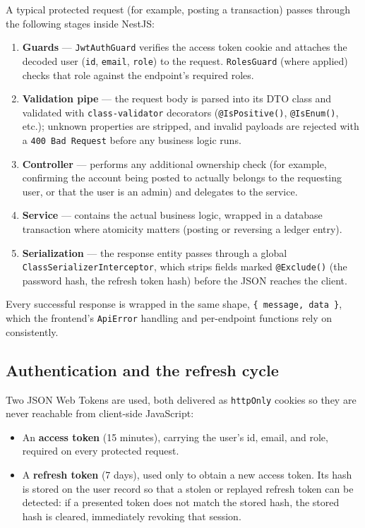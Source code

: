 \documentclass[11pt]{article}
\begin{document}
A typical protected request (for example, posting a transaction) passes
through the following stages inside NestJS:

\begin{enumerate}[nosep]
    \item \textbf{Guards} --- \texttt{JwtAuthGuard} verifies the access
    token cookie and attaches the decoded user (\texttt{id}, \texttt{email},
    \texttt{role}) to the request. \texttt{RolesGuard} (where applied)
    checks that role against the endpoint's required roles.
    \item \textbf{Validation pipe} --- the request body is parsed into
    its DTO class and validated with \texttt{class-validator} decorators
    (\texttt{@IsPositive()}, \texttt{@IsEnum()}, etc.); unknown properties
    are stripped, and invalid payloads are rejected with a
    \texttt{400 Bad Request} before any business logic runs.
    \item \textbf{Controller} --- performs any additional ownership check
    (for example, confirming the account being posted to actually belongs
    to the requesting user, or that the user is an admin) and delegates
    to the service.
    \item \textbf{Service} --- contains the actual business logic,
    wrapped in a database transaction where atomicity matters (posting or
    reversing a ledger entry).
    \item \textbf{Serialization} --- the response entity passes through a
    global \texttt{ClassSerializerInterceptor}, which strips fields
    marked \texttt{@Exclude()} (the password hash, the refresh token
    hash) before the JSON reaches the client.
\end{enumerate}

Every successful response is wrapped in the same shape,
\texttt{\{ message, data \}}, which the frontend's \texttt{ApiError}
handling and per-endpoint functions rely on consistently.

\subsection{Authentication and the refresh cycle}

Two JSON Web Tokens are used, both delivered as \texttt{httpOnly} cookies
so they are never reachable from client-side JavaScript:

\begin{itemize}[nosep]
    \item An \textbf{access token} (15 minutes), carrying the user's id,
    email, and role, required on every protected request.
    \item A \textbf{refresh token} (7 days), used only to obtain a new
    access token. Its hash is stored on the user record so that a stolen
    or replayed refresh token can be detected: if a presented token does
    not match the stored hash, the stored hash is cleared, immediately
    revoking that session.
\end{itemize}
\end{document}
